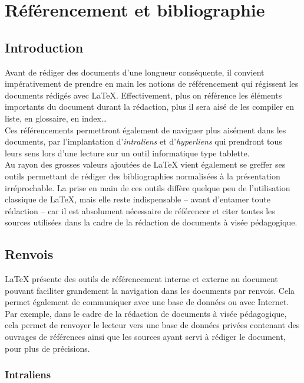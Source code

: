 \documentclass[a4paper, 11pt, twoside, fleqn]{memoir}
\begin{document}

\chapter{Référencement et bibliographie}
	\ChapFrame %
	
	\section{Introduction}
	
	Avant de rédiger des documents d'une longueur conséquente, il convient impérativement de prendre en main les notions de référencement qui régissent les documents rédigés avec \LaTeX{}. Effectivement, plus on référence les éléments importants du document durant la rédaction, plus il sera aisé de les compiler en liste, en glossaire, en index\ldots\\ Ces référencements permettront également de naviguer plus aisément dans les documents, par l'implantation d'\emph{intraliens} et d'\emph{hyperliens} qui prendront tous leurs sens lors d'une lecture sur un outil informatique type tablette.\\ 
	
	Au rayon des grosses valeurs ajoutées de \LaTeX{} vient également se greffer ses outils permettant de rédiger des bibliographies normalisées à la présentation irréprochable. La prise en main de ces outils diffère quelque peu de l'utilisation classique de \LaTeX{}, mais elle reste indispensable -- avant d'entamer toute rédaction -- car il est absolument nécessaire de référencer et citer toutes les sources utilisées dans la cadre de la rédaction de documents à visée pédagogique.

	\section{Renvois}
	
	\LaTeX{} présente des outils de référencement interne et externe au document pouvant faciliter grandement la navigation dans les documents par renvois. Cela permet également de communiquer avec une base de données ou avec Internet. Par exemple, dans le cadre de la rédaction de documents à visée pédagogique, cela permet de renvoyer le lecteur vers une base de données privées contenant des ouvrages de références ainsi que les sources ayant servi à rédiger le document, pour plus de précisions.
	
	\subsection{Intraliens}
	
\end{document}
